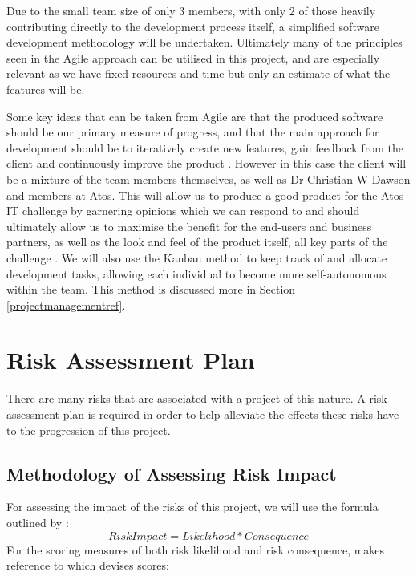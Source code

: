 \documentclass{article}
\begin{document}
Due to the small team size of only 3 members, with only 2 of those heavily contributing directly to the development process itself, a simplified software development methodology will be undertaken. Ultimately many of the principles seen in the Agile approach can be utilised in this project, and are especially relevant as we have fixed resources and time but only an estimate of what the features will be.
\par
Some key ideas that can be taken from Agile are that the produced software should be our primary measure of progress, and that the main approach for development should be to iteratively create new features, gain feedback from the client and continuously improve the product \parencite{agilemanifesto, layton2012agile}. However in this case the client will be a mixture of the team members themselves, as well as Dr Christian W Dawson and members at Atos. This will allow us to produce a good product for the Atos IT challenge by garnering opinions which we can respond to and should ultimately allow us to maximise the benefit for the end-users and business partners, as well as the look and feel of the product itself, all key parts of the challenge \parencite{atosrules}. We will also use the Kanban method to keep track of and allocate development tasks, allowing each individual to become more self-autonomous within the team. This method is discussed more in Section \ref{projectmanagementref}.

\section{Risk Assessment Plan}

There are many risks that are associated with a project of this nature. A risk assessment plan is required in order to help alleviate the effects these risks have to the progression of this project.

\subsection{Methodology of Assessing Risk Impact}

For assessing the impact of the risks of this project, we will use the formula outlined by \textcite[][84]{dawson15}:
\begin{equation}
Risk Impact = Likelihood * Consequence
\end{equation}
For the scoring measures of both risk likelihood and risk consequence, \textcite[][85]{dawson15} makes reference to \textcite[][256]{turner93} which devises scores:
\end{document}
